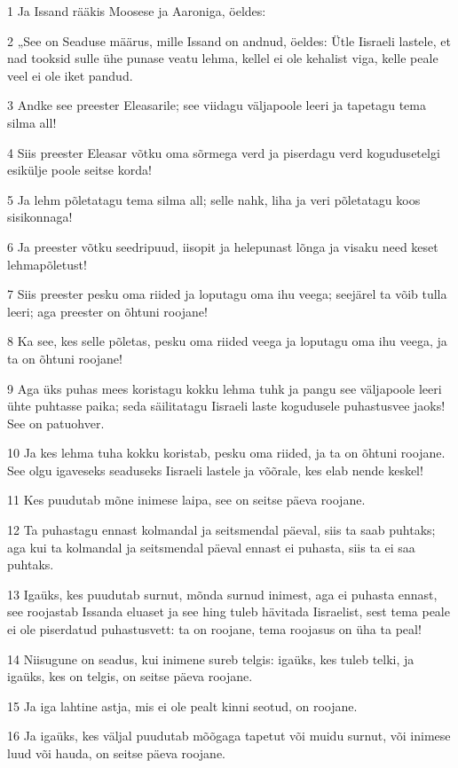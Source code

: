 \par 1 Ja Issand rääkis Moosese ja Aaroniga, öeldes:
\par 2 „See on Seaduse määrus, mille Issand on andnud, öeldes: Ütle Iisraeli lastele, et nad tooksid sulle ühe punase veatu lehma, kellel ei ole kehalist viga, kelle peale veel ei ole iket pandud.
\par 3 Andke see preester Eleasarile; see viidagu väljapoole leeri ja tapetagu tema silma all!
\par 4 Siis preester Eleasar võtku oma sõrmega verd ja piserdagu verd kogudusetelgi esikülje poole seitse korda!
\par 5 Ja lehm põletatagu tema silma all; selle nahk, liha ja veri põletatagu koos sisikonnaga!
\par 6 Ja preester võtku seedripuud, iisopit ja helepunast lõnga ja visaku need keset lehmapõletust!
\par 7 Siis preester pesku oma riided ja loputagu oma ihu veega; seejärel ta võib tulla leeri; aga preester on õhtuni roojane!
\par 8 Ka see, kes selle põletas, pesku oma riided veega ja loputagu oma ihu veega, ja ta on õhtuni roojane!
\par 9 Aga üks puhas mees koristagu kokku lehma tuhk ja pangu see väljapoole leeri ühte puhtasse paika; seda säilitatagu Iisraeli laste kogudusele puhastusvee jaoks! See on patuohver.
\par 10 Ja kes lehma tuha kokku koristab, pesku oma riided, ja ta on õhtuni roojane. See olgu igaveseks seaduseks Iisraeli lastele ja võõrale, kes elab nende keskel!
\par 11 Kes puudutab mõne inimese laipa, see on seitse päeva roojane.
\par 12 Ta puhastagu ennast kolmandal ja seitsmendal päeval, siis ta saab puhtaks; aga kui ta kolmandal ja seitsmendal päeval ennast ei puhasta, siis ta ei saa puhtaks.
\par 13 Igaüks, kes puudutab surnut, mõnda surnud inimest, aga ei puhasta ennast, see roojastab Issanda eluaset ja see hing tuleb hävitada Iisraelist, sest tema peale ei ole piserdatud puhastusvett: ta on roojane, tema roojasus on üha ta peal!
\par 14 Niisugune on seadus, kui inimene sureb telgis: igaüks, kes tuleb telki, ja igaüks, kes on telgis, on seitse päeva roojane.
\par 15 Ja iga lahtine astja, mis ei ole pealt kinni seotud, on roojane.
\par 16 Ja igaüks, kes väljal puudutab mõõgaga tapetut või muidu surnut, või inimese luud või hauda, on seitse päeva roojane.
